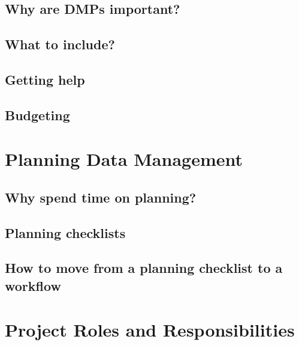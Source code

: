 \documentclass[
]{book}
\begin{document}
\hypertarget{why-are-dmps-important}{%
\section{Why are DMPs important?}\label{why-are-dmps-important}}

\hypertarget{what-to-include}{%
\section{What to include?}\label{what-to-include}}

\hypertarget{getting-help}{%
\section{Getting help}\label{getting-help}}

\hypertarget{budgeting}{%
\section{Budgeting}\label{budgeting}}

\hypertarget{planning-data-management}{%
\chapter{Planning Data Management}\label{planning-data-management}}

\hypertarget{why-spend-time-on-planning}{%
\section{Why spend time on planning?}\label{why-spend-time-on-planning}}

\hypertarget{planning-checklists}{%
\section{Planning checklists}\label{planning-checklists}}

\hypertarget{how-to-move-from-a-planning-checklist-to-a-workflow}{%
\section{How to move from a planning checklist to a workflow}\label{how-to-move-from-a-planning-checklist-to-a-workflow}}

\hypertarget{project-roles-and-responsibilities}{%
\chapter{Project Roles and Responsibilities}\label{project-roles-and-responsibilities}}
\end{document}
